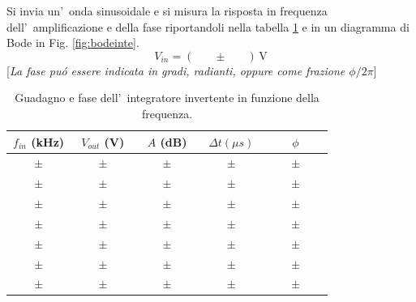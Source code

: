 \documentclass[10pt,a4paper]{article}
\newcommand{\rem}[1]{[\emph{#1}]}
\newcommand{\exn}{\phantom{xxx}}
\begin{document}
	Si invia un'~onda sinusoidale e si misura la risposta in frequenza dell'~amplificazione e della fase riportandoli 
	nella tabella \ref{tab:bodeinte} e in un diagramma di Bode in Fig. \ref{fig:bodeinte}. 
	\[
	V_{in} = (\exn \pm \exn )\,\mathrm{V}
	\]
	\rem{La fase pu\'o essere indicata in gradi, radianti, oppure come frazione $\phi/2\pi$}
	\begin{table}[h]
		\caption{Guadagno e fase dell'~integratore invertente in funzione della frequenza.}
		\label{tab:bodeinte}
		\begin{center}
			\begin{tabular}{|c|c|c|c|c|}
				\hline
				$f_{in}$ (kHz) & $V_{out}$ (V) & $A$ (dB) & $\Delta t (\mu s)$ & $\phi$ \\
				\hline
				$\exn \pm \exn $ & $\exn \pm \exn $ & $\exn \pm \exn $ & $\exn \pm \exn $ & $\exn \pm \exn $ \\
				\hline
				$\exn \pm \exn $ & $\exn \pm \exn $ & $\exn \pm \exn $ & $\exn \pm \exn $ & $\exn \pm \exn $ \\
				\hline
				$\exn \pm \exn $ & $\exn \pm \exn $ & $\exn \pm \exn $ & $\exn \pm \exn $ & $\exn \pm \exn $ \\
				\hline
				$\exn \pm \exn $ & $\exn \pm \exn $ & $\exn \pm \exn $ & $\exn \pm \exn $ & $\exn \pm \exn $ \\
				\hline
				$\exn \pm \exn $ & $\exn \pm \exn $ & $\exn \pm \exn $ & $\exn \pm \exn $ & $\exn \pm \exn $ \\
				\hline
				$\exn \pm \exn $ & $\exn \pm \exn $ & $\exn \pm \exn $ & $\exn \pm \exn $ & $\exn \pm \exn $ \\
				\hline
				$\exn \pm \exn $ & $\exn \pm \exn $ & $\exn \pm \exn $ & $\exn \pm \exn $ & $\exn \pm \exn $ \\
				\hline
			\end{tabular}
		\end{center}
	\end{table} 
\end{document}
